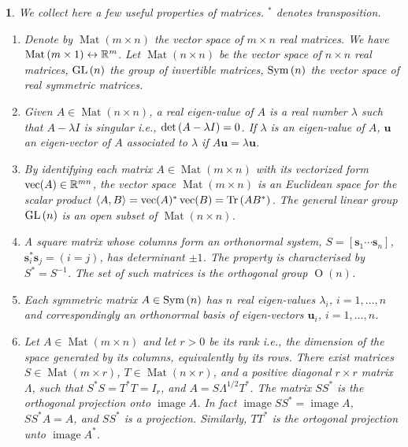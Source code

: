 \documentclass[12pt,a4paper]{amsart}
\newcommand{\Image}{\operatorname{image}}
\newcommand{\MRof}[2]{\operatorname{Mat}\left(#1\times#2\right)}
\newcommand{\Mof}[1]{\operatorname{Mat}\left(#1\times#1\right)}
\newcommand{\Oof}[1]{\operatorname{O}(#1)}
\newcommand{\bu}{\bm u}
\theoremstyle{plain}%
\newtheorem{npar}{}%
\theoremstyle{definition}
\theoremstyle{remark}
\begin{document}
\begin{npar} \normalfont
  We collect here a few useful properties of matrices. $^*$ denotes transposition. 
% 
  \begin{enumerate}
\item Denote by $\MRof m n$ the \emph{vector} space of $m \times n$ real matrices. We have $\MRof m 1 \leftrightarrow \reals^m$. Let $\Mof n$ be the vector space of $n\times n$ real matrices, $\operatorname{GL}\left(n\right)$ the group of invertible matrices, $\operatorname{Sym}\left(n\right)$ the vector space of real symmetric matrices.
\item Given $A \in \Mof n$, a real eigen-value of $A$ is a real number $\lambda$ such that $A - \lambda I$ is singular i.e., $\operatorname{det}\left(A - \lambda I\right)=0$. If $\lambda$ is an eigen-value of $A$, $\bu$ an eigen-vector of $A$ associated to $\lambda$ if $A\bu = \lambda\bu$. 
\item By identifying each matrix $A \in \MRof m n$ with its vectorized form $\operatorname{vec}(A) \in \mathbb{R}^{mn}$, the vector space $\MRof m n$ is an Euclidean space for the scalar product $\left\langle A,B\right\rangle = \operatorname{vec}(A)^*\operatorname{vec}(B) = \operatorname{Tr}\left(AB^*\right)$. The general linear group $\operatorname{GL}\left(n\right)$ is an open subset of $\Mof n$. 
\item A square matrix whose columns form an orthonormal system, $S = [\bm s_1 \cdots \bm s_n]$, $\bm s_i^* \bm s_j = (i=j)$, has determinant $\pm 1$. The property is characterised by $S^* = S^{-1}$. The set of such matrices is the orthogonal group $\Oof n$.    
\item  \emph{Each symmetric matrix $A \in \operatorname{Sym}\left(n\right)$ has $n$ real eigen-values $\lambda_i$, $i=1,\dots,n$ and correspondingly an orthonormal basis of eigen-vectors $\bu_i$, $i=1,\dots,n$}. 
\item Let $A \in \MRof m n$ and let $r > 0$ be its rank i.e., the dimension of the space generated by its columns, equivalently by its rows. There exist matrices $S \in \MRof m r$, $T \in \MRof n r$, and a positive diagonal $r \times r$ matrix $\Lambda$, such that $S^*S = T^*T = I_r$, and $A = S \Lambda^{1/2} T^*$. The matrix $SS^*$ is the orthogonal projection onto $\Image A$. In fact $\Image SS^* = \Image A$, $SS^* A = A$, and $SS^*$ is a projection. Similarly, $TT^*$ is the ortogonal projection unto $\Image A^*$. 

\end{enumerate}
\end{npar}
\end{document}
